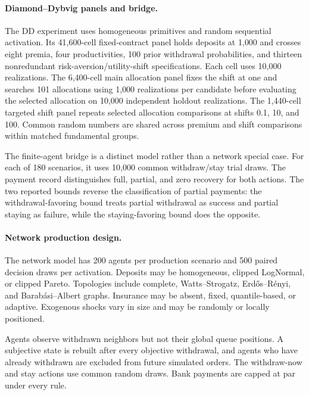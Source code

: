 \documentclass[12pt]{article}\usepackage[]{graphicx}\usepackage[]{xcolor}
\begin{document}
\paragraph{Diamond--Dybvig panels and bridge.}
The DD experiment uses homogeneous primitives and random sequential activation.
Its 41{,}600-cell fixed-contract panel holds deposits at 1{,}000 and crosses eight premia, four productivities, 100 prior withdrawal probabilities, and thirteen nonredundant risk-aversion/utility-shift specifications.
Each cell uses 10{,}000 realizations.
The 6{,}400-cell main allocation panel fixes the shift at one and searches 101 allocations using 1{,}000 realizations per candidate before evaluating the selected allocation on 10{,}000 independent holdout realizations.
The 1{,}440-cell targeted shift panel repeats selected allocation comparisons at shifts 0.1, 10, and 100.
Common random numbers are shared across premium and shift comparisons within matched fundamental groups.

The finite-agent bridge is a distinct model rather than a network special case.
For each of 180 scenarios, it uses 10{,}000 common withdraw/stay trial draws.
The payment record distinguishes full, partial, and zero recovery for both actions.
The two reported bounds reverse the classification of partial payments: the withdrawal-favoring bound treats partial withdrawal as success and partial staying as failure, while the staying-favoring bound does the opposite.

\paragraph{Network production design.}
The network model has 200 agents per production scenario and 500 paired decision draws per activation.
Deposits may be homogeneous, clipped LogNormal, or clipped Pareto.
Topologies include complete, Watts--Strogatz, Erdős--Rényi, and Barabási--Albert graphs.
Insurance may be absent, fixed, quantile-based, or adaptive.
Exogenous shocks vary in size and may be randomly or locally positioned.

Agents observe withdrawn neighbors but not their global queue positions.
A subjective state is rebuilt after every objective withdrawal, and agents who have already withdrawn are excluded from future simulated orders.
The withdraw-now and stay actions use common random draws.
Bank payments are capped at par under every rule.
\end{document}
